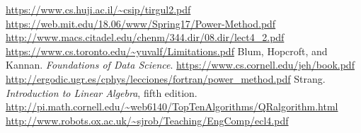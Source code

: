 \documentclass{article}
\begin{document}
\begin{thebibliography}{9}
   \url{https://www.cs.huji.ac.il/\~csip/tirgul2.pdf}
   \url{https://web.mit.edu/18.06/www/Spring17/Power-Method.pdf}
   \url{http://www.macs.citadel.edu/chenm/344.dir/08.dir/lect4_2.pdf}
   \url{https://www.cs.toronto.edu/\~yuvalf/Limitations.pdf}
   Blum, Hopcroft, and Kannan. \emph{Foundations of Data Science}. \url{https://www.cs.cornell.edu/jeh/book.pdf}
   \url{http://ergodic.ugr.es/cphys/lecciones/fortran/power_method.pdf}
   Strang. \emph{Introduction to Linear Algebra}, fifth edition.
   \url{http://pi.math.cornell.edu/\~web6140/TopTenAlgorithms/QRalgorithm.html}
   \url{http://www.robots.ox.ac.uk/\~sjrob/Teaching/EngComp/ecl4.pdf}
\end{thebibliography}
\end{document}
